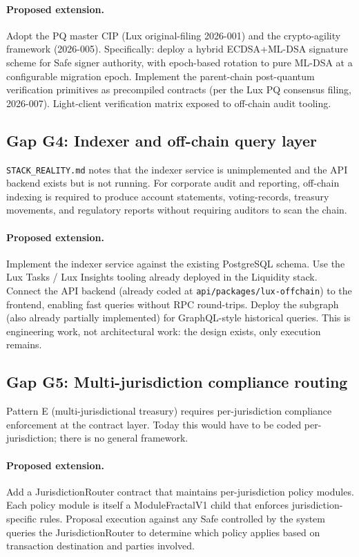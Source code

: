 \documentclass[11pt,letterpaper]{article}
\begin{document}
\paragraph{Proposed extension.} Adopt the PQ master CIP (Lux original-filing 2026-001) and the crypto-agility framework (2026-005). Specifically: deploy a hybrid ECDSA+ML-DSA signature scheme for Safe signer authority, with epoch-based rotation to pure ML-DSA at a configurable migration epoch. Implement the parent-chain post-quantum verification primitives as precompiled contracts (per the Lux PQ consensus filing, 2026-007). Light-client verification matrix exposed to off-chain audit tooling.

\subsection{Gap G4: Indexer and off-chain query layer}

\texttt{STACK\_REALITY.md} notes that the indexer service is unimplemented and the API backend exists but is not running. For corporate audit and reporting, off-chain indexing is required to produce account statements, voting-records, treasury movements, and regulatory reports without requiring auditors to scan the chain.

\paragraph{Proposed extension.} Implement the indexer service against the existing PostgreSQL schema. Use the Lux Tasks / Lux Insights tooling already deployed in the Liquidity stack. Connect the API backend (already coded at \texttt{api/packages/lux-offchain}) to the frontend, enabling fast queries without RPC round-trips. Deploy the subgraph (also already partially implemented) for GraphQL-style historical queries. This is engineering work, not architectural work: the design exists, only execution remains.

\subsection{Gap G5: Multi-jurisdiction compliance routing}

Pattern E (multi-jurisdictional treasury) requires per-jurisdiction compliance enforcement at the contract layer. Today this would have to be coded per-jurisdiction; there is no general framework.

\paragraph{Proposed extension.} Add a JurisdictionRouter contract that maintains per-jurisdiction policy modules. Each policy module is itself a ModuleFractalV1 child that enforces jurisdiction-specific rules. Proposal execution against any Safe controlled by the system queries the JurisdictionRouter to determine which policy applies based on transaction destination and parties involved.
\end{document}
